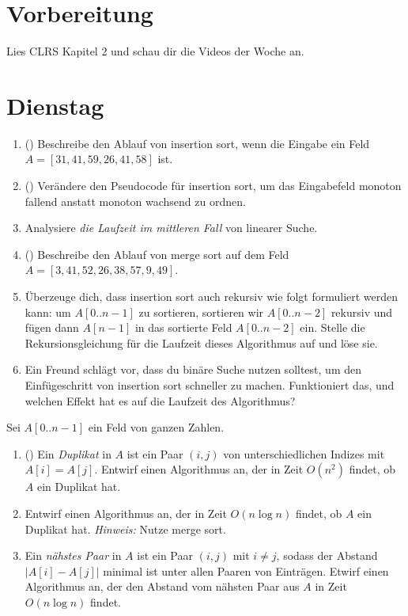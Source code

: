 \documentclass{uebung_cs}
\begin{document}
\section*{Vorbereitung}
Lies CLRS Kapitel 2 und schau dir die Videos der Woche an.

\section*{Dienstag}

\begin{aufgabe}\label{tue-first}\mbox{}
	\begin{enumerate}
		\item (\warmup) Beschreibe den Ablauf von insertion sort, wenn die Eingabe ein Feld $A=[31,41,59,26,41,58]$ ist.
		\item (\warmup) Verändere den Pseudocode für insertion sort, um das Eingabefeld monoton fallend anstatt monoton wachsend zu ordnen.	
		\item Analysiere \emph{die Laufzeit im mittleren Fall} von linearer Suche.
		\item (\warmup) Beschreibe den Ablauf von merge sort auf dem Feld $A=[3,41,52,26,38,57,9,49]$.
		\item Überzeuge dich, dass insertion sort auch rekursiv wie folgt formuliert werden kann: um $A[0..n-1]$ zu sortieren, sortieren wir $A[0..n-2]$ rekursiv und fügen dann $A[n-1]$ in das sortierte Feld $A[0..n-2]$ ein. Stelle die Rekursionsgleichung für die Laufzeit dieses Algorithmus auf und löse sie.
		\item Ein Freund schlägt vor, dass du binäre Suche nutzen solltest, um den Einfügeschritt von insertion sort schneller zu machen. Funktioniert das, und welchen Effekt hat es auf die Laufzeit des Algorithmus?
	\end{enumerate}
\end{aufgabe}

\begin{aufgabe}
	Sei $A[0..n-1]$ ein Feld von ganzen Zahlen.
	\begin{enumerate}
		\item (\warmup) Ein \emph{Duplikat} in $A$ ist ein Paar $(i,j)$ von unterschiedlichen Indizes mit $A[i]=A[j]$. Entwirf einen Algorithmus an, der in Zeit $O(n^2)$ findet, ob $A$ ein Duplikat hat.
		\item Entwirf einen Algorithmus an, der in Zeit $O(n\log n)$ findet, ob $A$ ein Duplikat hat. \emph{Hinweis:} Nutze merge sort.
		\item Ein \emph{nähstes Paar} in $A$ ist ein Paar $(i,j)$ mit $i\ne j$, sodass der Abstand $|A[i]-A[j]|$ minimal ist unter allen Paaren von Einträgen.
		Etwirf einen Algorithmus an, der den Abstand vom nähsten Paar aus $A$ in Zeit $O(n\log n)$ findet.
	\end{enumerate}
\end{aufgabe}
\end{document}
